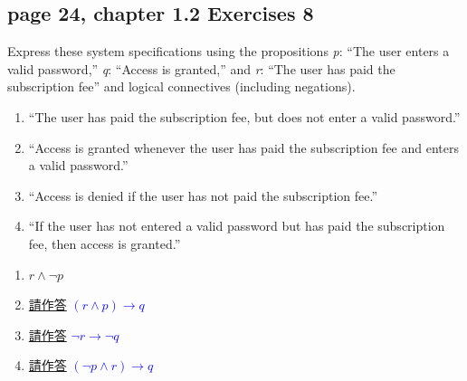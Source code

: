 \documentclass[sigconf]{acmart}
\newcommand{\answer}[2]{%
  \if\relax\detokenize{#2}\relax
    \underline{\mbox{請作答}}%
  \else
    \textcolor{blue}{#2}%
  \fi
}
\begin{document}
\subsection{page 24, chapter 1.2 Exercises 8}
\begin{shaded}
    Express these system specifications using the propositions \textit{p}: “The user enters a valid password,” \textit{q}: “Access is granted,” and \textit{r}: “The user has paid the subscription fee” and logical connectives (including negations).
    \begin{enumerate}[label=(\alph*)]
        \item “The user has paid the subscription fee, but does not
        enter a valid password.”
        \item “Access is granted whenever the user has paid the
        subscription fee and enters a valid password.”
        \item “Access is denied if the user has not paid the subscription fee.”
        \item “If the user has not entered a valid password but has
        paid the subscription fee, then access is granted.”
    \end{enumerate}
\end{shaded}  
\begin{enumerate}[label=(\alph*)]
	\item $r \land \neg p$
	\item \answer{1.2.8b}{$(r \land p) \rightarrow q$}
	\item \answer{1.2.8c}{$\neg r\rightarrow \neg q$}
	\item \answer{1.2.8d}{$(\neg p \land r)\rightarrow q$}
\end{enumerate}
\end{document}
